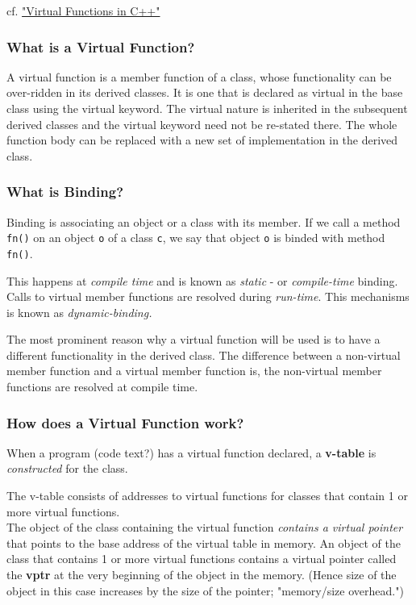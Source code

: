 \documentclass[10pt]{amsart}
\begin{document}
cf. \href{http://wayback.archive.org/web/20100209040010/http://www.codersource.net/published/view/325/virtual_functions_in.aspx}{"Virtual Functions in C++"}

\subsubsection{What is a Virtual Function?}  

A virtual function is a member function of a class, whose functionality can be over-ridden in its derived classes. It is one that is declared as virtual in the base class using the virtual keyword. The virtual nature is inherited in the subsequent derived classes and the virtual keyword need not be re-stated there. The whole function body can be replaced with a new set of implementation in the derived class. 

\subsubsection{What is Binding?}  

Binding is associating an object or a class with its member.   If we call a method \verb|fn()| on an object \verb|o| of a class \verb|c|, we say that object \verb|o| is binded with method \verb|fn()|.  

This happens at \emph{compile time} and is known as \emph{static} - or \emph{compile-time} binding.   
Calls to virtual member functions are resolved during \emph{run-time}.  This mechanisms is known as \emph{dynamic-binding.}   

The most prominent reason why a virtual function will be used is to have a different functionality in the derived class.  The difference between a non-virtual member function and a virtual member function is, the non-virtual member functions are resolved at compile time.  


\subsubsection{How does a Virtual Function work?}  

When a program (code text?) has a virtual function declared, a \textbf{v-table} is \emph{constructed} for the class.  

The v-table consists of addresses to virtual functions for classes that contain 1 or more virtual functions.  \\
The object of the class containing the virtual function \emph{contains a virtual pointer} that points to the base address of the virtual table in memory.  An object of the class that contains 1 or more virtual functions contains a virtual pointer called the \textbf{vptr} at the very beginning of the object in the memory.  (Hence size of the object in this case increases by the size of the pointer; "memory/size overhead.")  \\
\end{document}
